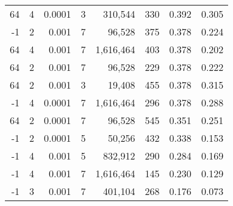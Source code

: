 \begin{tabular}{rrrrrrrr}
64 & 4 & 0.0001 & 3 & 310,544 & 330 & 0.392 & 0.305 \\
-1 & 2 & 0.001 & 7 & 96,528 & 375 & 0.378 & 0.224 \\
64 & 4 & 0.001 & 7 & 1,616,464 & 403 & 0.378 & 0.202 \\
64 & 2 & 0.001 & 7 & 96,528 & 229 & 0.378 & 0.222 \\
64 & 2 & 0.001 & 3 & 19,408 & 455 & 0.378 & 0.315 \\
-1 & 4 & 0.0001 & 7 & 1,616,464 & 296 & 0.378 & 0.288 \\
64 & 2 & 0.0001 & 7 & 96,528 & 545 & 0.351 & 0.251 \\
-1 & 2 & 0.0001 & 5 & 50,256 & 432 & 0.338 & 0.153 \\
-1 & 4 & 0.001 & 5 & 832,912 & 290 & 0.284 & 0.169 \\
-1 & 4 & 0.001 & 7 & 1,616,464 & 145 & 0.230 & 0.129 \\
-1 & 3 & 0.001 & 7 & 401,104 & 268 & 0.176 & 0.073 \\
\bottomrule
\end{tabular}
